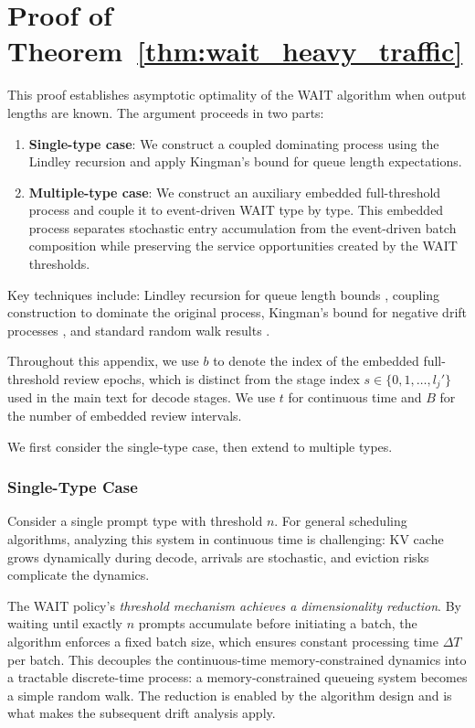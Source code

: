 
\section{Proof of Theorem~\ref{thm:wait_heavy_traffic}}\label{appexidx::proof of wait_heavy_traffic}

This proof establishes asymptotic optimality of the WAIT algorithm when output lengths are known. The argument proceeds in two parts:
\begin{enumerate}
    \item \textbf{Single-type case}: We construct a coupled dominating process using the Lindley recursion and apply Kingman's bound for queue length expectations.
    \item \textbf{Multiple-type case}: We construct an auxiliary embedded full-threshold process and couple it to event-driven WAIT type by type. This embedded process separates stochastic entry accumulation from the event-driven batch composition while preserving the service opportunities created by the WAIT thresholds.
\end{enumerate}
Key techniques include: Lindley recursion for queue length bounds \citep[Proposition 6.3]{asmussen2003applied}, coupling construction to dominate the original process, Kingman's bound for negative drift processes \citep{kingman1962queues}, and standard random walk results \citep{strait1974maximum}.

Throughout this appendix, we use \(b\) to denote the index of the embedded full-threshold review epochs, which is distinct from the stage index \(s \in \{0,1,\ldots,l_j'\}\) used in the main text for decode stages. We use \(t\) for continuous time and \(B\) for the number of embedded review intervals.

We first consider the single-type case, then extend to multiple types.

\subsubsection{Single-Type Case}

Consider a single prompt type with threshold $n$. For general scheduling algorithms, analyzing this system in continuous time is challenging: KV cache grows dynamically during decode, arrivals are stochastic, and eviction risks complicate the dynamics.

The WAIT policy's \emph{threshold mechanism achieves a dimensionality reduction}. By waiting until exactly $n$ prompts accumulate before initiating a batch, the algorithm enforces a fixed batch size, which ensures constant processing time $\Delta T$ per batch. This decouples the continuous-time memory-constrained dynamics into a tractable discrete-time process: a memory-constrained queueing system becomes a simple random walk. The reduction is enabled by the algorithm design and is what makes the subsequent drift analysis apply.

